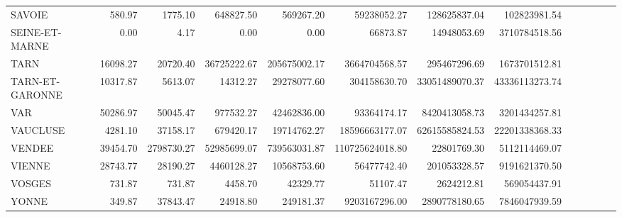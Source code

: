 \documentclass[11pt, a4paper]{article}
\begin{document}
\begin{landscape}
\begin{tabular}{lrrrrrrrrrrrr}
    SAVOIE & 580.97 & 1775.10 & 648827.50 & 569267.20 & 59238052.27 & 128625837.04 & 102823981.54 \\ 
    SEINE-ET-MARNE & 0.00 & 4.17 & 0.00 & 0.00 & 66873.87 & 14948053.69 & 3710784518.56 \\ 
    TARN & 16098.27 & 20720.40 & 36725222.67 & 205675002.17 & 3664704568.57 & 295467296.69 & 1673701512.81 \\ 
    TARN-ET-GARONNE & 10317.87 & 5613.07 & 14312.27 & 29278077.60 & 304158630.70 & 33051489070.37 & 43336113273.74 \\ 
    VAR & 50286.97 & 50045.47 & 977532.27 & 42462836.00 & 93364174.17 & 8420413058.73 & 3201434257.81 \\ 
    VAUCLUSE & 4281.10 & 37158.17 & 679420.17 & 19714762.27 & 18596663177.07 & 62615585824.53 & 22201338368.33 \\ 
    VENDEE & 39454.70 & 2798730.27 & 52985699.07 & 739563031.87 & 110725624018.80 & 22801769.30 & 5112114469.07 \\ 
    VIENNE & 28743.77 & 28190.27 & 4460128.27 & 10568753.60 & 56477742.40 & 201053328.57 & 9191621370.50 \\ 
    VOSGES & 731.87 & 731.87 & 4458.70 & 42329.77 & 51107.47 & 2624212.81 & 569054437.91 \\ 
    YONNE & 349.87 & 37843.47 & 24918.80 & 249181.37 & 9203167296.00 & 2890778180.65 & 7846047939.59 \\ 
     \hline
  \end{tabular}
  \FloatBarrier
\end{landscape}
\newpage
\end{document}
